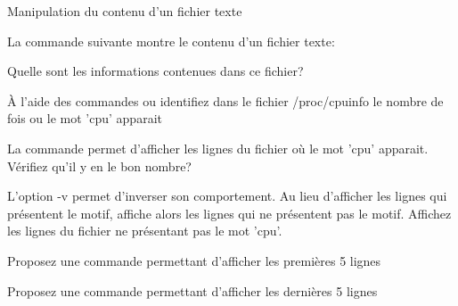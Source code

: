 \begin{exercice}
  \begin{exercicelet}{Manipulation du contenu d'un fichier texte}
    \begin{questions}
    \item La commande suivante montre le contenu d'un fichier texte:
      \begin{center}
        \small{  }
      \end{center}
    \item Quelle sont les informations contenues dans ce fichier?
    \item À l'aide des commandes  ou  identifiez dans
      le fichier /proc/cpuinfo le nombre de fois ou le mot 'cpu'
      apparait
    \item La commande  permet d'afficher
      les lignes du fichier  où le mot 'cpu'
      apparait. Vérifiez qu'il y en le bon nombre?
    \item L'option -v permet d'inverser son comportement. Au lieu
      d'afficher les lignes qui présentent le motif,  affiche
      alors les lignes qui ne présentent pas le motif. Affichez les
      lignes du fichier  ne présentant pas le mot
      'cpu'.
    \item Proposez une commande permettant d'afficher les premières 5
      lignes
    \item Proposez une commande permettant d'afficher les dernières 5
      lignes
    \end{questions}
  \end{exercicelet}
\end{exercice}


